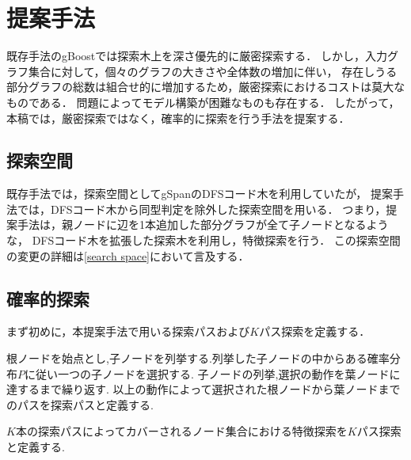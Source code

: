 \chapter{提案手法}
既存手法のgBoostでは探索木上を深さ優先的に厳密探索する．
しかし，入力グラフ集合に対して，個々のグラフの大きさや全体数の増加に伴い，
存在しうる部分グラフの総数は組合せ的に増加するため，厳密探索におけるコストは莫大なものである．
問題によってモデル構築が困難なものも存在する．
したがって，本稿では，厳密探索ではなく，確率的に探索を行う手法を提案する．

\section{探索空間}
既存手法では，探索空間としてgSpan\cite{gSpan}のDFSコード木を利用していたが，
提案手法では，DFSコード木から同型判定を除外した探索空間を用いる．
つまり，提案手法は，親ノードに辺を1本追加した部分グラフが全て子ノードとなるような，
DFSコード木を拡張した探索木を利用し，特徴探索を行う．
この探索空間の変更の詳細は\ref{search space}において言及する．

\section{確率的探索}
まず初めに，本提案手法で用いる探索パスおよび$K$パス探索を定義する．
\begin{Definition}[探索パス]
	根ノードを始点とし,子ノードを列挙する.列挙した子ノードの中からある確率分布$P$に従い一つの子ノードを選択する.
	子ノードの列挙,選択の動作を葉ノードに達するまで繰り返す.
	以上の動作によって選択された根ノードから葉ノードまでのパスを探索パスと定義する.
\end{Definition}
\begin{Definition}[$K$パス探索]
	$K$本の探索パスによってカバーされるノード集合における特徴探索を$K$パス探索と定義する.
\end{Definition}

